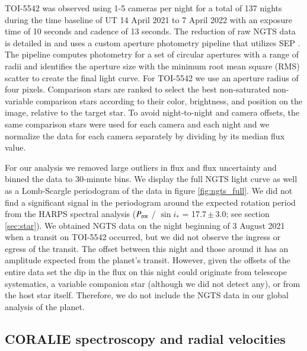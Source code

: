 \documentclass{aa}
\begin{document}
TOI-5542 was observed using 1-5 cameras per night for a total of 137 nights during the time baseline of UT 14 April 2021 to 7 April 2022 with an exposure time of 10 seconds and cadence of 13 seconds. The reduction of raw NGTS data is detailed in \citet{Bryant2020} and uses a custom aperture photometry pipeline that utilizes SEP \citep{Bertin1996,Barbary2016}. The pipeline computes photometry for a set of circular apertures with a range of radii and identifies the aperture size with the minimum root mean square (RMS) scatter to create the final light curve. For TOI-5542 we use an aperture radius of four pixels. Comparison stars are ranked to select the best non-saturated non-variable comparison stars according to their color, brightness, and position on the image, relative to the target star. To avoid night-to-night and camera offsets, the same comparison stars were used for each camera and each night and we normalize the data for each camera separately by dividing by its median flux value.

For our analysis we removed large outliers in flux and flux uncertainty and binned the data to 30-minute bins. We display the full NGTS light curve as well as a Lomb-Scargle periodogram of the data in figure \ref{fig:ngts_full}. We did not find a significant signal in the periodogram around the expected rotation period from the HARPS spectral analysis ($P_{\rm rot}$ / $\sin i_{*}$ = 17.7\,$\pm$\,3.0; see section \ref{sec:star}). We obtained NGTS data on the night beginning of 3 August 2021 when a transit on TOI-5542 occurred, but we did not observe the ingress or egress of the transit. The offset between this night and those around it has an amplitude expected from the planet's transit. However, given the offsets of the entire data set the dip in the flux on this night could originate from telescope systematics, a variable companion star (although we did not detect any), or from the host star itself. Therefore, we do not include the NGTS data in our global analysis of the planet.

\subsection{CORALIE spectroscopy and radial velocities}
\end{document}
